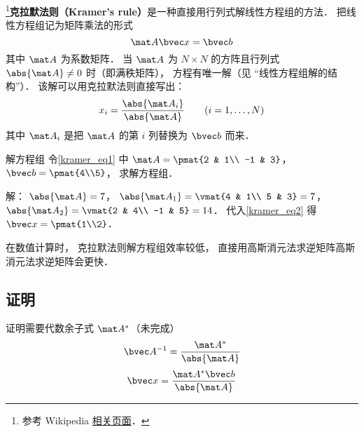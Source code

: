 
\begin{issues}
\issueTODO
\end{issues}


\footnote{参考 Wikipedia \href{https://en.wikipedia.org/wiki/Cramer's_rule}{相关页面}．}\textbf{克拉默法则（Kramer's rule）}是一种直接用行列式解线性方程组的方法． 把线性方程组记为矩阵乘法的形式
\begin{equation}\label{kramer_eq1}
\mat A \bvec x = \bvec b
\end{equation}
其中 $\mat A$ 为系数矩阵． 当 $\mat A$ 为 $N\times N$ 的方阵且行列式 $\abs{\mat A} \ne 0$ 时（即满秩矩阵）， 方程有唯一解（见 “线性方程组解的结构”）． 该解可以用克拉默法则直接写出：
\begin{equation}\label{kramer_eq2}
x_i = \frac{\abs{\mat A_i}}{\abs{\mat A}} \qquad (i = 1, \dots, N)
\end{equation}
其中 $\mat A_i$ 是把 $\mat A$ 的第 $i$ 列替换为 $\bvec b$ 而来．

\begin{example}{解方程组}
令\autoref{kramer_eq1} 中 $\mat A = \pmat{2 & 1\\ -1 & 3}$， $\bvec b = \pmat{4\\5}$， 求解方程组．

解： $\abs{\mat A} = 7$， $\abs{\mat A_1} = \vmat{4 & 1\\ 5 & 3} = 7$， $\abs{\mat A_2} = \vmat{2 & 4\\ -1 & 5} = 14$． 代入\autoref{kramer_eq2} 得 $\bvec x = \pmat{1\\2}$．
\end{example}

在数值计算时， 克拉默法则解方程组效率较低， 直接用高斯消元法求逆矩阵高斯消元法求逆矩阵会更快．

\subsection{证明}
证明需要代数余子式 $\mat A^*$（未完成）
\begin{equation}
\bvec A^{-1} = \frac{\mat A^*}{\abs{\mat A}}
\end{equation}
\begin{equation}
\bvec x = \frac{\mat A^* \bvec b}{\abs{\mat A}}
\end{equation}

